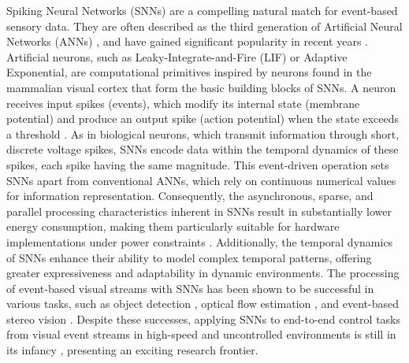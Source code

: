 \documentclass{article}
\begin{document}
Spiking Neural Networks (SNNs) are a compelling natural match for event-based sensory data. They are often described as the third generation of Artificial Neural Networks (ANNs) \cite{maassNetworksSpikingNeurons1997a}, and have gained significant popularity in recent years \cite{gallegoEventbasedVisionSurvey2022}. Artificial neurons, such as Leaky-Integrate-and-Fire (LIF) or Adaptive Exponential, are computational primitives inspired by neurons found in the mammalian visual cortex that form the basic building blocks of SNNs. A neuron receives input spikes (events), which modify its internal state (membrane potential) and produce an output spike (action potential) when the state exceeds a threshold \cite{gallegoEventbasedVisionSurvey2022}. As in biological neurons, which transmit information through short, discrete voltage spikes, SNNs encode data within the temporal dynamics of these spikes, each spike having the same magnitude. This event-driven operation sets SNNs apart from conventional ANNs, which rely on continuous numerical values for information representation. Consequently, the asynchronous, sparse, and parallel processing characteristics inherent in SNNs result in substantially lower energy consumption, making them particularly suitable for hardware implementations under power constraints \cite{farsaLowCostHighSpeedNeuromorphic2019, siddiqueLowCostNeuromorphic2023}. Additionally, the temporal dynamics of SNNs enhance their ability to model complex temporal patterns, offering greater expressiveness and adaptability in dynamic environments. The processing of event-based visual streams with SNNs has been shown to be successful in various tasks, such as object detection \cite{iaboniEventbasedSpikingNeural2024}, optical flow estimation \cite{cuadradoOpticalFlowEstimation2023}, and event-based stereo vision \cite{osswaldSpikingNeuralNetwork2017}. Despite these successes, applying SNNs to end-to-end control tasks from visual event streams in high-speed and uncontrolled environments is still in its infancy \cite{stroobantsNeuromorphicAttitudeEstimation2025, paredes-vallesFullyNeuromorphicVision2023b, onizTrajectoryControlQuadrotors2024}, presenting an exciting research frontier. 
\end{document}
